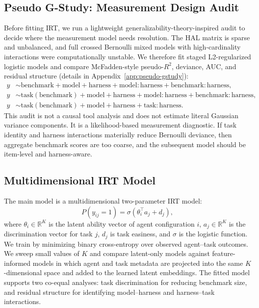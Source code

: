 \documentclass{article}
\begin{document}
\subsection{Pseudo G-Study: Measurement Design Audit}

Before fitting IRT, we run a lightweight generalizability-theory-inspired audit to decide where the measurement model needs resolution. The HAL matrix is sparse and unbalanced, and full crossed Bernoulli mixed models with high-cardinality interactions were computationally unstable. We therefore fit staged L2-regularized logistic models and compare McFadden-style pseudo-$R^2$, deviance, AUC, and residual structure (details in Appendix~\ref{app:pseudo-gstudy}):
\[
\begin{aligned}
  y &\sim \text{benchmark} + \text{model} + \text{harness}
       + \text{model}:\text{harness}
       + \text{benchmark}:\text{harness},\\
  y &\sim \text{task}(\text{benchmark}) + \text{model} + \text{harness}
       + \text{model}:\text{harness}
       + \text{benchmark}:\text{harness},\\
  y &\sim \text{task}(\text{benchmark}) + \text{model} + \text{harness}
       + \text{task}:\text{harness}.
\end{aligned}
\]
This audit is not a causal tool analysis and does not estimate literal Gaussian variance components. It is a likelihood-based measurement diagnostic. If task identity and harness interactions materially reduce Bernoulli deviance, then aggregate benchmark scores are too coarse, and the subsequent model should be item-level and harness-aware.

\subsection{Multidimensional IRT Model}

The main model is a multidimensional two-parameter IRT model:
\[
  P(y_{ij}=1) = \sigma(\theta_i^\top a_j + d_j),
\]
where $\theta_i \in \mathbb{R}^K$ is the latent ability vector of agent configuration $i$, $a_j \in \mathbb{R}^K$ is the discrimination vector for task $j$, $d_j$ is task easiness, and $\sigma$ is the logistic function. We train by minimizing binary cross-entropy over observed agent--task outcomes. We sweep small values of $K$ and compare latent-only models against feature-informed models in which agent and task metadata are projected into the same $K$-dimensional space and added to the learned latent embeddings. The fitted model supports two co-equal analyses: task discrimination for reducing benchmark size, and residual structure for identifying model--harness and harness--task interactions.
\end{document}
